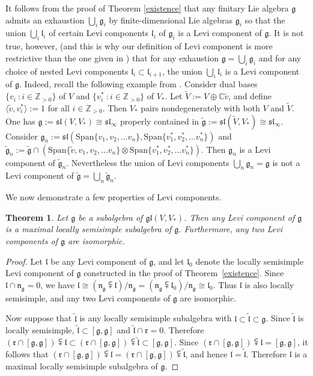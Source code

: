 \documentclass{article}
\newcommand {\Z} {\mathbb{Z}}
\newcommand {\C} {\mathbb{C}}
\def\gl{\mathfrak {gl}}
\def\g{\mathfrak {g}}
\def\l{\mathfrak {l}}
\def\n{\mathfrak {n}}
\def\sl{\mathfrak{sl}}
\def\r{\mathfrak{r}}
\newcommand {\Span}{\mathrm{Span}}
\newtheorem{thm}{Theorem}[section]
\begin{document}
It follows from the proof of Theorem \ref{existence} that any finitary Lie algebra $\g$ admits an exhaustion $\bigcup_i \g_i$ by finite-dimensional Lie algebras $\g_i$ so that the union $\bigcup_i \l_i$ of certain Levi components $\l_i$ of $\g_i$ is a Levi component of $\g$.  It is not true, however, (and this is why our definition of Levi component is more restrictive than the one given in \cite{Ba}) that for any exhaustion $\g = \bigcup_i \g_i$ and for any choice of nested Levi components $\l_i \subset \l_{i+1}$, the union $\bigcup_i \l_i$ is a Levi component of $\g$. 
Indeed, recall the following example from \cite[Example 2]{DP4}.  Consider dual bases $\{v_i ~\colon i \in \Z_{>0} \}$ of $V$ and $\{v_i^* ~\colon i \in \Z_{>0} \}$ of $V_*$.  Let $\tilde{V} := V \oplus \C \tilde{v}$, and  define $\langle \tilde{v} , v_i^* \rangle := 1$ for all $i \in \Z_{>0}$.  Then $V_*$ pairs nondegenerately with both $V$ and $\tilde{V}$.  One has $\g := \sl(V,V_*) \cong \sl_\infty$ properly contained in $\tilde{\g} := \sl(\tilde{V}, V_*) \cong \sl_\infty$.  Consider $\g_n := \sl ( \Span \{ v_1 , v_2 , \ldots v_n \} , \Span \{ v_1^* , v_2^* , \ldots v_n^* \} )$ and $\tilde{\g}_n := \tilde{\g} \cap ( \Span \{ \tilde{v}  , v_1 , v_2 , \ldots v_n \} \otimes \Span \{ v_1^* , v_2^* , \ldots v_n^* \} )$.  Then $\g_n$ is a Levi component of $\tilde{\g}_n$.
Nevertheless the union of Levi components $\bigcup_n \g_n = \g$ is not a Levi component of $\tilde{\g} = \bigcup_n \tilde{\g}_n$.

We now demonstrate a few properties of Levi components.


\begin{thm} \label{maxlocss}
Let $\g$ be a subalgebra of $\gl(V,V_*)$.  Then any Levi component of $\g$ is a maximal locally semisimple subalgebra of $\g$.  Furthermore, any two Levi components of $\g$ are isomorphic.
\end{thm}

\begin{proof} 
Let $\l$ be any Levi component of $\g$, and let $\l_0$ denote the locally semisimple Levi component of $\g$ constructed in the proof of Theorem~\ref{existence}.  Since $\l \cap \n_\g = 0$, we have $\l \cong (\n_\g \subsetplus \l )/ \n_\g = ( \n_\g \subsetplus \l_0 )/ \n_\g \cong \l_0$.  Thus $\l$ is also locally semisimple, and any two Levi components of $\g$ are isomorphic.  

Now suppose that $\tilde{\l}$ is any locally semisimple subalgebra with $\l \subset \tilde{\l} \subset \g$.  Since $\tilde{\l}$ is locally semisimple, $\tilde{\l} \subset [\g,\g]$ and $\tilde{\l} \cap \r = 0$.  Therefore $(\r \cap [\g,\g]) \subsetplus \l \subset (\r \cap [\g,\g]) \subsetplus \tilde{\l} \subset [\g,\g]$.  Since $(\r \cap [\g,\g]) \subsetplus \l = [\g,\g]$, it follows that $(\r \cap [\g,\g]) \subsetplus \l = (\r \cap [\g,\g]) \subsetplus \tilde{\l}$, and hence $\l = \tilde{\l}$.  Therefore $\l$ is a maximal locally semisimple subalgebra of $\g$.
\end{proof}
\end{document}
